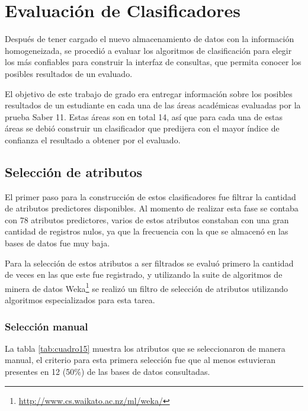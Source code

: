 \chapter{Evaluación de Clasificadores}
Después de tener cargado el nuevo almacenamiento de datos con la información homogeneizada, se procedió a evaluar los algoritmos de clasificación para elegir los más confiables para construir la interfaz de consultas, que permita conocer los posibles resultados de un evaluado.

El objetivo de este trabajo de grado era entregar información sobre los posibles resultados de un estudiante en cada una de las áreas académicas evaluadas por la prueba Saber 11\degree. Estas áreas son en total 14, así que para cada una de estas áreas se debió construir un clasificador que predijera con el mayor índice de confianza el resultado a obtener por el evaluado.
\section{Selección de atributos}
El primer paso para la construcción de estos clasificadores fue filtrar la cantidad de atributos predictores disponibles. Al momento de realizar esta fase se contaba con 78 atributos predictores, varios de estos atributos constaban con una gran cantidad de registros nulos, ya que la frecuencia con la que se almacenó en las bases de datos fue muy baja.

Para la selección de estos atributos a ser filtrados se evaluó primero la cantidad de veces en las que este fue registrado, y utilizando la suite de algoritmos de minera de datos Weka\footnote{\url{http://www.cs.waikato.ac.nz/ml/weka/}} se realizó un filtro de selección de atributos utilizando algoritmos especializados para esta tarea.
\subsection{Selección manual}
La tabla \ref{tab:cuadro15} muestra los atributos que se seleccionaron de manera manual, el criterio para esta primera selección fue que al menos estuvieran presentes en 12 (50\%) de las bases de datos consultadas.

